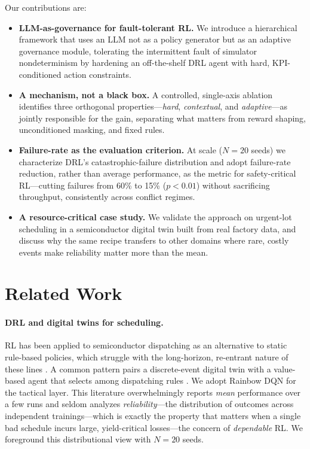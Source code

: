 \documentclass[letterpaper]{article} %
\begin{document}
\noindent Our contributions are:
\begin{itemize}
\setlength\itemsep{0.15em}
\item \textbf{LLM-as-governance for fault-tolerant RL.} We introduce a
hierarchical framework that uses an LLM not as a policy generator but as an
adaptive governance module, tolerating the intermittent fault of simulator
nondeterminism by hardening an off-the-shelf DRL agent with hard, KPI-conditioned
action constraints.
\item \textbf{A mechanism, not a black box.} A controlled, single-axis ablation
identifies three orthogonal properties---\emph{hard}, \emph{contextual}, and
\emph{adaptive}---as jointly responsible for the gain, separating what matters
from reward shaping, unconditioned masking, and fixed rules.
\item \textbf{Failure-rate as the evaluation criterion.} At scale ($N{=}20$
seeds) we characterize DRL's catastrophic-failure distribution and adopt
failure-rate reduction, rather than average performance, as the metric for
safety-critical RL---cutting failures from 60\% to 15\% ($p{<}0.01$) without
sacrificing throughput, consistently across conflict regimes.
\item \textbf{A resource-critical case study.} We validate the approach on
urgent-lot scheduling in a semiconductor digital twin built from real factory
data, and discuss why the same recipe transfers to other domains where rare,
costly events make reliability matter more than the mean.
\end{itemize}

\section{Related Work}
\label{sec:related}

\paragraph{DRL and digital twins for scheduling.}
RL has been applied to semiconductor dispatching as an alternative to static
rule-based policies, which struggle with the long-horizon, re-entrant nature of
these lines \citep{waschneck2018,hu2019}. A common pattern pairs a discrete-event
digital twin with a value-based agent that selects among dispatching rules
\citep{lee2025}. We adopt Rainbow DQN \citep{hessel2018} for the tactical layer.
This literature overwhelmingly reports \emph{mean} performance over a few runs
and seldom analyzes \emph{reliability}---the distribution of outcomes across
independent trainings---which is exactly the property that matters when a single
bad schedule incurs large, yield-critical losses---the concern of
\emph{dependable} RL. We foreground this distributional view with $N{=}20$ seeds.
\end{document}
